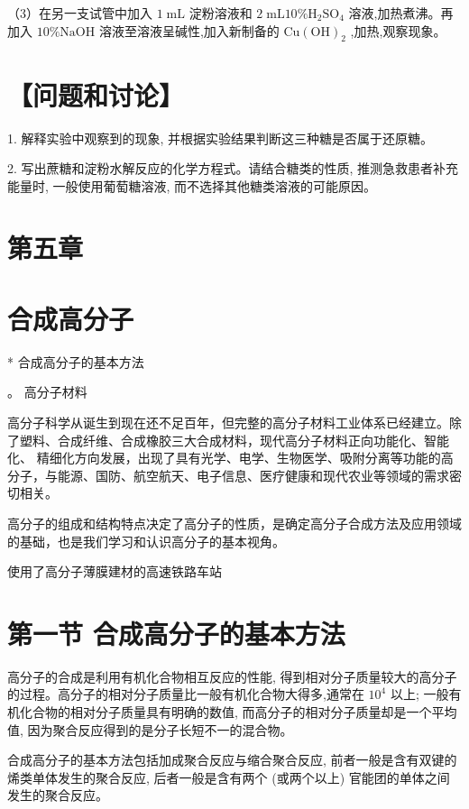 \documentclass[10pt]{article}
\begin{document}
（3）在另一支试管中加入 \(1\mathrm{\;{mL}}\) 淀粉溶液和 \(2\mathrm{\;{mL}}{10}\% {\mathrm{H}}_{2}{\mathrm{{SO}}}_{4}\) 溶液,加热煮沸。再加入 \({10}\% \mathrm{{NaOH}}\) 溶液至溶液呈碱性,加入新制备的 \(\mathrm{{Cu}}{\left( \mathrm{{OH}}\right) }_{2}\) ,加热,观察现象。

\section*{【问题和讨论】}

1. 解释实验中观察到的现象, 并根据实验结果判断这三种糖是否属于还原糖。

2. 写出蔗糖和淀粉水解反应的化学方程式。请结合糖类的性质, 推测急救患者补充能量时, 一般使用葡萄糖溶液, 而不选择其他糖类溶液的可能原因。

\section*{第五章}

\section*{合成高分子}

* 合成高分子的基本方法

。 高分子材料

高分子科学从诞生到现在还不足百年，但完整的高分子材料工业体系已经建立。除了塑料、合成纤维、合成橡胶三大合成材料，现代高分子材料正向功能化、智能化、 精细化方向发展，出现了具有光学、电学、生物医学、吸附分离等功能的高分子，与能源、国防、航空航天、电子信息、医疗健康和现代农业等领域的需求密切相关。

高分子的组成和结构特点决定了高分子的性质，是确定高分子合成方法及应用领域的基础，也是我们学习和认识高分子的基本视角。

使用了高分子薄膜建材的高速铁路车站

\section*{第一节 合成高分子的基本方法}

高分子的合成是利用有机化合物相互反应的性能, 得到相对分子质量较大的高分子的过程。高分子的相对分子质量比一般有机化合物大得多,通常在 \({10}^{4}\) 以上; 一般有机化合物的相对分子质量具有明确的数值, 而高分子的相对分子质量却是一个平均值, 因为聚合反应得到的是分子长短不一的混合物。

合成高分子的基本方法包括加成聚合反应与缩合聚合反应, 前者一般是含有双键的烯类单体发生的聚合反应, 后者一般是含有两个 (或两个以上) 官能团的单体之间发生的聚合反应。
\end{document}

